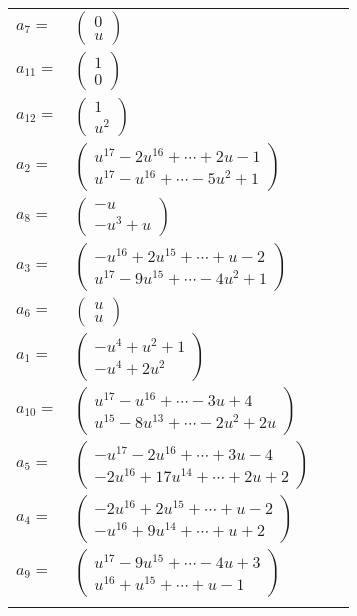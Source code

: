 \documentclass[1p]{elsarticle_modified}
\theoremstyle{definition}
\begin{document}
\begin{tabular}{m{7pt} m{180pt} m{7pt} m{180pt} }
\flushright $a_{7}=$&$\begin{pmatrix}0\\u\end{pmatrix}$ \\
\flushright $a_{11}=$&$\begin{pmatrix}1\\0\end{pmatrix}$ \\
\flushright $a_{12}=$&$\begin{pmatrix}1\\u^2\end{pmatrix}$ \\
\flushright $a_{2}=$&$\begin{pmatrix}u^{17}-2 u^{16}+\cdots+2 u-1\\u^{17}- u^{16}+\cdots-5 u^2+1\end{pmatrix}$ \\
\flushright $a_{8}=$&$\begin{pmatrix}- u\\- u^3+u\end{pmatrix}$ \\
\flushright $a_{3}=$&$\begin{pmatrix}- u^{16}+2 u^{15}+\cdots+u-2\\u^{17}-9 u^{15}+\cdots-4 u^2+1\end{pmatrix}$ \\
\flushright $a_{6}=$&$\begin{pmatrix}u\\u\end{pmatrix}$ \\
\flushright $a_{1}=$&$\begin{pmatrix}- u^4+u^2+1\\- u^4+2 u^2\end{pmatrix}$ \\
\flushright $a_{10}=$&$\begin{pmatrix}u^{17}- u^{16}+\cdots-3 u+4\\u^{15}-8 u^{13}+\cdots-2 u^2+2 u\end{pmatrix}$ \\
\flushright $a_{5}=$&$\begin{pmatrix}- u^{17}-2 u^{16}+\cdots+3 u-4\\-2 u^{16}+17 u^{14}+\cdots+2 u+2\end{pmatrix}$ \\
\flushright $a_{4}=$&$\begin{pmatrix}-2 u^{16}+2 u^{15}+\cdots+u-2\\- u^{16}+9 u^{14}+\cdots+u+2\end{pmatrix}$ \\
\flushright $a_{9}=$&$\begin{pmatrix}u^{17}-9 u^{15}+\cdots-4 u+3\\u^{16}+u^{15}+\cdots+u-1\end{pmatrix}$\\&\end{tabular}
\end{document}
